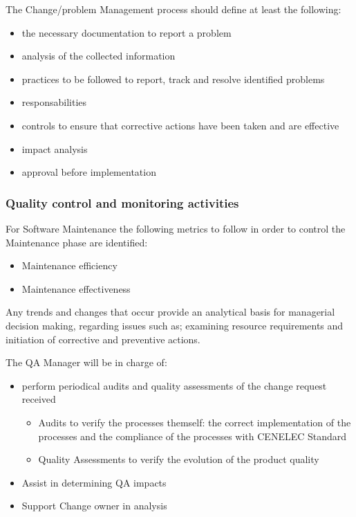\documentclass{template/openetcs_article}
\begin{document}
The Change/problem Management process should define at least the following:
\begin{itemize}
\item the necessary documentation to report a problem
\item analysis of the collected information
\item practices to be followed to report, track and resolve identified problems
\item responsabilities 
\item controls to ensure that corrective actions have been taken and are effective
\item impact analysis
\item approval before implementation
\end{itemize}

\subsubsection{Quality control and monitoring activities}
For Software Maintenance the following metrics to follow in order to control the Maintenance phase are identified:
\begin{itemize}
\item Maintenance efficiency
\item Maintenance effectiveness
\end{itemize}

Any trends and changes that occur provide an analytical basis for managerial decision making, regarding issues such as; examining resource requirements and initiation of corrective and preventive actions. 

The QA Manager will be in charge of:
\begin{itemize}
\item perform periodical audits and quality assessments of the change request received
\begin{itemize}
\item Audits to verify the processes themself: the correct implementation of the processes and the compliance of the processes with CENELEC Standard
\item Quality Assessments to verify the evolution of the product quality
\end{itemize}
\item Assist in determining QA impacts
\item Support Change owner in analysis
\end{itemize}
\end{document}
